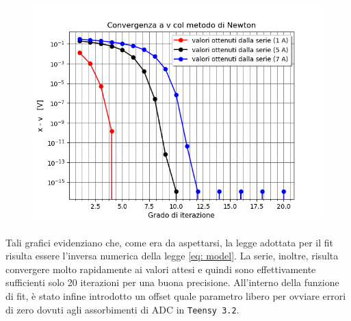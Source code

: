 \documentclass{article}[a4paper, oneside, 11pt]
\begin{document}
\begin{figure}[H]
	\centering 
 		\includegraphics[scale=0.75]{./Figura3_appendiceB.png}
\end{figure}

Tali grafici evidenziano che, come era da aspettarsi, la legge adottata per il 
fit risulta essere l’inversa numerica della legge \eqref{eq: model}. La serie, inoltre, 
risulta convergere molto rapidamente ai valori attesi e quindi sono 
effettivamente sufficienti solo 20 iterazioni per una buona precisione.
All’interno della funzione di fit, è stato infine introdotto un offset quale 
parametro libero per ovviare errori di zero dovuti agli assorbimenti di ADC in 
\verb+Teensy 3.2+.

\medskip


\end{document}
